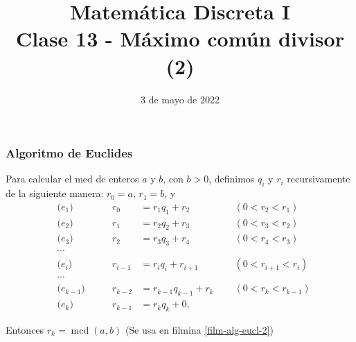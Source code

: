 \documentclass[handout]{beamer} %
\title[Clase 12 - MCD (2)]{Matemática Discreta I \\ Clase 13 - Máximo común divisor (2)}
\institute[]{\normalsize FAMAF / UNC
    \\[\baselineskip] ${}^{}$
    \\[\baselineskip]
}
\date[03/05/2022]{3 de mayo  de 2022}
\newcommand{\mcd}{\operatorname{mcd}}
\begin{document}
    
    \frame{\titlepage} 
    
    
    
    \begin{frame}\frametitle{Algoritmo de Euclides}\label{film-alg-eucl}
        Para calcular el mcd de enteros $a$ y $b$, con $b >0$, 
        definimos $q_i$ y $r_i$ recursivamente  de la siguiente manera: $r_0 = a$, $r_1 = b$,  y \pause
        \begin{align*}
            &\text{($e_{1}$)}\qquad& r_0&=r_1 q_1 + r_2& &(0 < r_2<r_1)\\
            &\text{($e_{2}$)}\qquad& r_1&=r_2q_2 + r_3\quad{}\quad{}\quad{}& &(0 < r_3<r_2)  \\
            &\text{($e_{3}$)}\qquad& r_2&=r_3q_3 + r_4\quad{}\quad{}\quad{}& &(0 < r_4<r_3)  \\
            &\cdots&&\\
            &\text{($e_{i}$)}\qquad& r_{i-1}&=r_{i}q_{i} + r_{i+1}& &(0 < r_{i+1} <r_{i}) \\
            &\cdots&& \\
            &\text{($e_{k-1}$)}\qquad& r_{k-2}&=r_{k-1}q_{k-1} + r_{k}& &(0 < r_{k} <r_{k-1}) \\
            &\text{($e_{k}$)}\qquad& r_{k-1}&=r_{k}q_{k} + 0 ,&&  
        \end{align*}\pause
        
        Entonces $r_k = \mcd(a,b)$ {\color{gray} \qquad (Se usa en filmina \ref{film-alg-eucl-2})}
    \end{frame}

    
\end{document}

